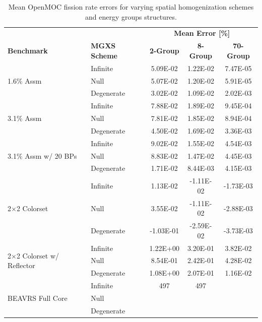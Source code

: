 \begin{table}[h!]
  \centering
  \caption[Mean OpenMOC fission rate errors]{Mean OpenMOC fission rate errors for varying spatial homogenization schemes and energy groups structures.}
  \small
  \label{table:chap8-openmoc-mean-fiss-rates}
  \vspace{6pt}
  \begin{tabular}{l l c c c}
  \toprule
  \rowcolor{lightgray}
  & & \multicolumn{3}{c}{\cellcolor{lightgray} \textbf{Mean Error [\%]}} \\
  \multirow{-2}{*}{\cellcolor{lightgray} \bf Benchmark} &
  \multirow{-2}{*}{\cellcolor{lightgray} \bf \ac{MGXS} Scheme} &
  {\cellcolor{lightgray} \bf 2-Group} &
  {\cellcolor{lightgray} \bf 8-Group} &
  {\cellcolor{lightgray} \bf 70-Group} \\
  \midrule
\multirow{3}{*}{\parbox{2.5cm}{1.6\% Assm}} & Infinite & 5.09E-02 & 1.22E-02 & 7.47E-05 \\
& Null & 5.07E-02 & 1.20E-02 & 5.91E-05 \\
& Degenerate & 3.02E-02 & 1.09E-02 & 2.02E-03 \\
  \midrule
\multirow{3}{*}{\parbox{2.5cm}{3.1\% Assm}} & Infinite & 7.88E-02 & 1.89E-02 & 9.45E-04 \\
& Null & 7.81E-02 & 1.85E-02 & 8.94E-04 \\
& Degenerate & 4.50E-02 & 1.69E-02 & 3.36E-03 \\
  \midrule
\multirow{3}{*}{\parbox{2.5cm}{3.1\% Assm w/ 20 BPs}} & Infinite & 9.02E-02 & 1.55E-02 & 4.54E-03 \\
& Null & 8.83E-02 & 1.47E-02 & 4.45E-03 \\
& Degenerate & 1.71E-02 & 8.44E-03 & 4.15E-03 \\
  \midrule
\multirow{3}{*}{\parbox{2.5cm}{2$\times$2 Colorset}} & Infinite & 1.13E-02 & -1.11E-02 & -1.73E-03 \\
& Null & 3.55E-02 & -1.11E-02 & -2.88E-03 \\
& Degenerate & -1.03E-01 & -2.59E-02 & -3.73E-03 \\
  \midrule
\multirow{3}{*}{\parbox{2.5cm}{2$\times$2 Colorset w/ Reflector}} & Infinite & 1.22E+00 & 3.20E-01 & 3.82E-02 \\
& Null & 8.54E-01 & 2.42E-01 & 4.28E-02 \\
& Degenerate & 1.08E+00 & 2.07E-01 & 1.16E-02 \\
  \midrule
  \multirow{3}{*}{\parbox{2cm}{\ac{BEAVRS} Full Core}} & Infinite & 497 & 497 & \\
  & Null & & & \\
  & Degenerate & & & \\
  \bottomrule
\end{tabular}
\end{table}

